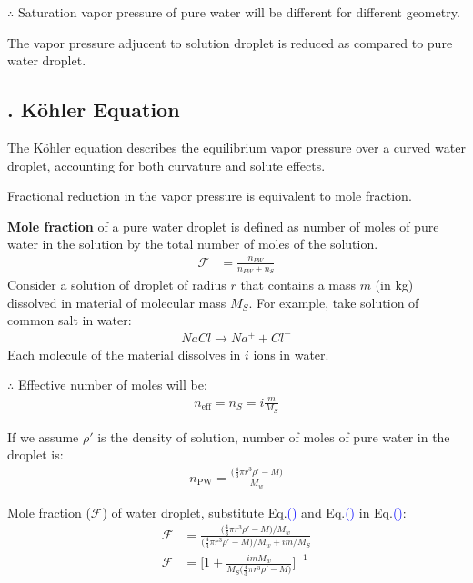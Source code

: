 \documentclass[fleqn,10pt]{SelfArx} %
\newcommand{\myeqref}[1]{\textcolor{blue}{\textup{(\getrefnumber{#1})}}}
\begin{document}
$\therefore$ Saturation vapor pressure of pure water will be different for different geometry.

The vapor pressure adjucent to solution droplet is reduced as compared to pure water droplet. 

\subsection{. K\"{o}hler Equation}
The K\"{o}hler equation describes the equilibrium vapor pressure over a curved water droplet, accounting for both curvature and solute effects.

Fractional reduction in the vapor pressure is equivalent to mole fraction.

\textbf{Mole fraction} of a pure water droplet is defined as number of moles of pure water in the solution by the total number of moles of the solution.
\begin{align}
    \mathcal{F} &= \frac{n_{PW}}{n_{PW}+n_S} \label{eq:mole-fraction}
\end{align}
Consider a solution of droplet of radius $r$ that contains a mass $m$ (in kg) dissolved in material of molecular mass $M_S$.
For example, take solution of common salt in water:
\begin{align*}
    NaCl \rightarrow Na^{+} + Cl^{-}
\end{align*}
Each molecule of the material dissolves in $i$ ions in water.

$\therefore$ Effective number of moles will be:
\begin{align}
    n_{\text{eff}} = n_{S} = i\frac{m}{M_S} \label{eq:n-S}
\end{align}

If we assume $\rho'$ is the density of solution, number of moles of pure water in the droplet is:
\begin{align*}
    n_{\text{PW}} = \frac{\big(\frac{4}{3}\pi r^3 \rho' -M\big)}{M_w} \label{eq:n-PW}
\end{align*}

Mole fraction ($\mathcal{F}$) of water droplet, substitute Eq.\myeqref{eq:n-S} and Eq.\myeqref{eq:n-PW} in Eq.\myeqref{eq:mole-fraction}:
\begin{align}
    \mathcal{F} &= \frac{\big(\frac{4}{3}\pi r^3 \rho' - M\big)/M_w}{\big(\frac{4}{3}\pi r^3 \rho' - M\big)/M_w + im/M_S} \\
    \mathcal{F} &= \Big[1 + \frac{imM_w}{M_S\big(\frac{4}{3}\pi r^3 \rho' - M\big)}\Big]^{-1}
\end{align}
\end{document}
